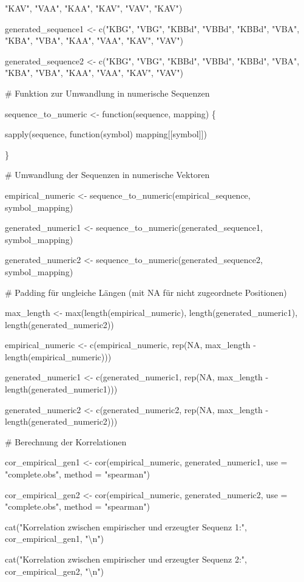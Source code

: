 \documentclass[
]{article}
\begin{document}
"KAV", "VAA", "KAA", "KAV", "VAV", "KAV")

generated\_sequence1 \textless- c("KBG", "VBG", "KBBd", "VBBd", "KBBd",
"VBA", "KBA", "VBA", "KAA", "VAA", "KAV", "VAV")

generated\_sequence2 \textless- c("KBG", "VBG", "KBBd", "VBBd", "KBBd",
"VBA", "KBA", "VBA", "KAA", "VAA", "KAV", "VAV")

\# Funktion zur Umwandlung in numerische Sequenzen

sequence\_to\_numeric \textless- function(sequence, mapping) \{

sapply(sequence, function(symbol) mapping{[}{[}symbol{]}{]})

\}

\# Umwandlung der Sequenzen in numerische Vektoren

empirical\_numeric \textless- sequence\_to\_numeric(empirical\_sequence,
symbol\_mapping)

generated\_numeric1 \textless-
sequence\_to\_numeric(generated\_sequence1, symbol\_mapping)

generated\_numeric2 \textless-
sequence\_to\_numeric(generated\_sequence2, symbol\_mapping)

\# Padding für ungleiche Längen (mit NA für nicht zugeordnete
Positionen)

max\_length \textless- max(length(empirical\_numeric),
length(generated\_numeric1), length(generated\_numeric2))

empirical\_numeric \textless- c(empirical\_numeric, rep(NA, max\_length
- length(empirical\_numeric)))

generated\_numeric1 \textless- c(generated\_numeric1, rep(NA,
max\_length - length(generated\_numeric1)))

generated\_numeric2 \textless- c(generated\_numeric2, rep(NA,
max\_length - length(generated\_numeric2)))

\# Berechnung der Korrelationen

cor\_empirical\_gen1 \textless- cor(empirical\_numeric,
generated\_numeric1, use = "complete.obs", method = "spearman")

cor\_empirical\_gen2 \textless- cor(empirical\_numeric,
generated\_numeric2, use = "complete.obs", method = "spearman")

cat("Korrelation zwischen empirischer und erzeugter Sequenz 1:",
cor\_empirical\_gen1, "\textbackslash n")

cat("Korrelation zwischen empirischer und erzeugter Sequenz 2:",
cor\_empirical\_gen2, "\textbackslash n")
\end{document}
